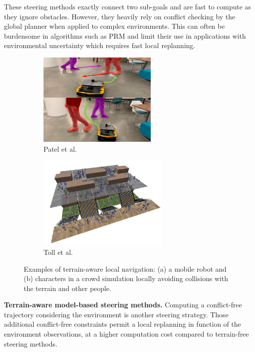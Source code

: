 These steering methods exactly connect two sub-goals and are fast to compute as they ignore obstacles.
However, they heavily rely on conflict checking by the global planner when applied to complex environments. 
This can often be burdensome in algorithms such as PRM and limit their use in applications with environmental uncertainty which requires fast local replanning.\\

\begin{figure}[h]
    \centering
    \captionsetup[subfigure]{justification=centering}
    \begin{subfigure}[t]{0.4\linewidth}
    \includegraphics[width=\textwidth,height=4.5cm]{Figures/Chapter_SOTA//dwa_rl.png}
    \caption{Patel et al. \cite{patel_dwa_rl_2021}}
    \label{fig:local_nav_0}
    \end{subfigure}
    \begin{subfigure}[t]{0.5\linewidth}
    \includegraphics[width=\textwidth,height=4.5cm]{Figures/Chapter_SOTA//real_time_density_geraerts.png}
    \caption{Toll et al. \cite{van_toll_crowd_sim_2012}}
    \label{fig:local_nav_1}
    \end{subfigure}
    \caption{Examples of terrain-aware local navigation: (a) a mobile robot and (b) characters in a crowd simulation locally avoiding collisions with the terrain and other people.}
    \label{fig:local_nav}
\end{figure}

\noindent\textbf{Terrain-aware model-based steering methods.}
Computing a conflict-free trajectory considering the environment is another steering strategy. 
Those additional conflict-free constraints permit a local replanning in function of the environment observations, at a higher computation cost compared to terrain-free steering methods.

